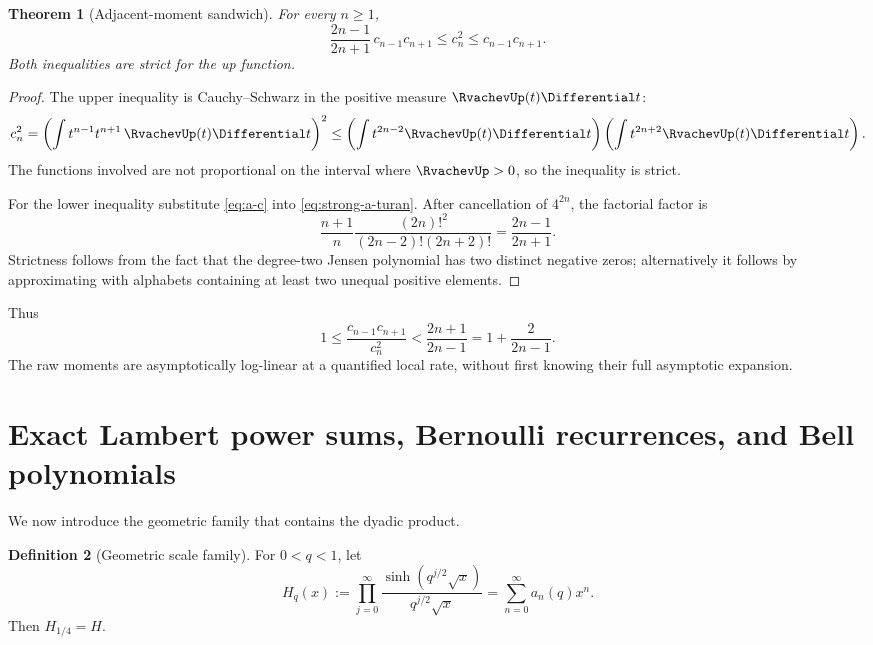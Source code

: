 \documentclass[11pt]{article}
\numberwithin{equation}{section}
\newtheorem{theorem}{Theorem}[section]
\theoremstyle{definition}
\newtheorem{definition}[theorem]{Definition}
\theoremstyle{remark}
\begin{document}
\begin{theorem}[Adjacent-moment sandwich]\label{thm:moment-sandwich}
For every $n\ge1$,
\begin{equation}\label{eq:moment-sandwich}
 \frac{2n-1}{2n+1}\,c_{n-1}c_{n+1}
 \le c_n^2
 \le c_{n-1}c_{n+1}.
\end{equation}
Both inequalities are strict for the up function.
\end{theorem}
\begin{proof}
The upper inequality is Cauchy--Schwarz in the positive measure $\RvachevUp(t)\Differential t$:
\[
 c_n^2=\left(\int t^{n-1}t^{n+1}\,\RvachevUp(t)\Differential t\right)^2
 \le\left(\int t^{2n-2}\RvachevUp(t)\Differential t\right)
     \left(\int t^{2n+2}\RvachevUp(t)\Differential t\right).
\]
The functions involved are not proportional on the interval where $\RvachevUp>0$, so the inequality is strict.

For the lower inequality substitute \eqref{eq:a-c} into \eqref{eq:strong-a-turan}.  After cancellation of $4^{2n}$, the factorial factor is
\[
 \frac{n+1}{n}\frac{(2n)!^2}{(2n-2)!(2n+2)!}
 =\frac{2n-1}{2n+1}.
\]
Strictness follows from the fact that the degree-two Jensen polynomial has two distinct negative zeros; alternatively it follows by approximating with alphabets containing at least two unequal positive elements.
\end{proof}

Thus
\begin{equation}\label{eq:moment-ratio-pinch}
 1\le\frac{c_{n-1}c_{n+1}}{c_n^2}<\frac{2n+1}{2n-1}=1+\frac{2}{2n-1}.
\end{equation}
The raw moments are asymptotically log-linear at a quantified local rate, without first knowing their full asymptotic expansion.

\section{Exact Lambert power sums, Bernoulli recurrences, and Bell polynomials}\label{sec:bell}

We now introduce the geometric family that contains the dyadic product.

\begin{definition}[Geometric scale family]\label{def:Hq}
For $0<q<1$, let
\begin{equation}\label{eq:Hq}
 H_q(x):=\prod_{j=0}^{\infty}
 \frac{\sinh(q^{j/2}\sqrt{x})}{q^{j/2}\sqrt{x}}
 =\sum_{n=0}^{\infty}a_n(q)x^n.
\end{equation}
Then $H_{1/4}=H$.
\end{definition}
\end{document}
